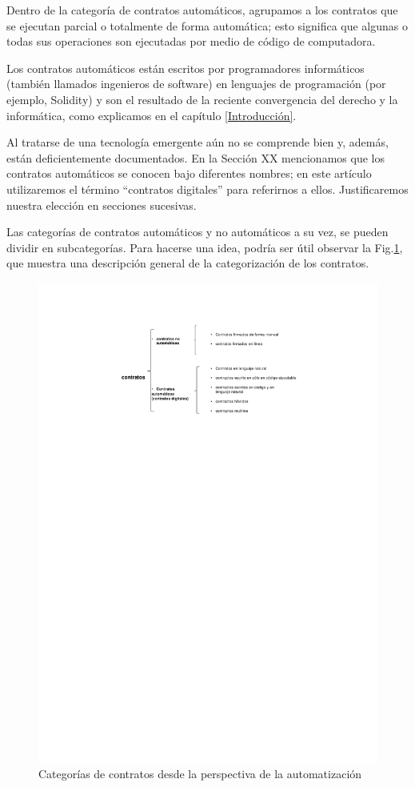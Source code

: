 \documentclass[12pt]{report} %
\begin{document}
Dentro de la categoría de contratos automáticos, agrupamos a los contratos que se ejecutan parcial o totalmente de forma automática; esto significa que algunas o todas sus operaciones son ejecutadas por medio de código de computadora.

Los contratos automáticos están escritos por programadores informáticos (también llamados ingenieros de software) en lenguajes de programación (por ejemplo, Solidity) y son el resultado de la reciente convergencia del derecho y la informática, como explicamos en el capítulo \ref{Introducción}.

Al tratarse de una tecnología emergente aún no se comprende bien y, además, están deficientemente documentados. En la Sección XX mencionamos que los contratos automáticos se conocen bajo diferentes nombres; en este artículo utilizaremos el término “contratos digitales” para referirnos a ellos. Justificaremos nuestra elección en secciones sucesivas. 

Las categorías de contratos automáticos y no automáticos a su vez, se pueden dividir en subcategorías. Para hacerse una idea, podría ser útil observar la Fig.\ref{llavescontratos}, que muestra una descripción general de la categorización de los contratos.



\begin{figure}
\centering
\includegraphics[width=0.85\columnwidth]{imagenes/llavescontratos.pdf}
\caption{Categorías de contratos desde la perspectiva de la automatización}
\label{llavescontratos}
\end{figure} 
\end{document}
